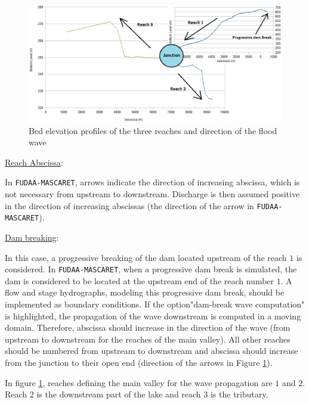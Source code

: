 \documentclass[a4paper,12pt]{article}
\begin{document}
\begin{figure}[h]
  \begin{center}
  \includegraphics[scale=0.49]{profiles}
  \caption{\label{fig:bottom-levels}Bed elevation profiles of the three reaches and direction of the flood wave}
  \end{center}
\end{figure}

\underline{Reach Abscissa}:

In \texttt{FUDAA-MASCARET}, arrows indicate the direction of increasing
abscissa, which is not necessary from upstream to downstream. Discharge is
then assumed positive in the direction of increasing abscissas
(the direction of the arrow in \texttt{FUDAA-MASCARET}).

\underline{Dam breaking}:

In this case, a progressive breaking of the dam located upstream of the reach
$1$ is considered. In \texttt{FUDAA-MASCARET}, when a progressive dam break is
simulated, the dam is considered to be located at the upstream end of the reach number $1$. A flow and stage hydrographs, modeling this
progressive dam break, should be implemented as boundary conditions. 
If the option"dam-break wave computation" is highlighted, the propagation
of the wave downstream is computed in a moving domain. Therefore, abscissa should increase in the direction of
the wave (from upstream to downstream for the reaches of the main valley). 
All other reaches should be numbered from upstream to downstream
and abscissa should increase from the junction to their open end (direction
of the arrows in Figure \ref{fig:bottom-levels}).

In figure \ref{fig:bottom-levels}, reaches defining the main valley for the wave propagation are $1$ and
$2$. Reach 2 is the downstream part of the lake and reach 3 is the tributary. 
\end{document}
